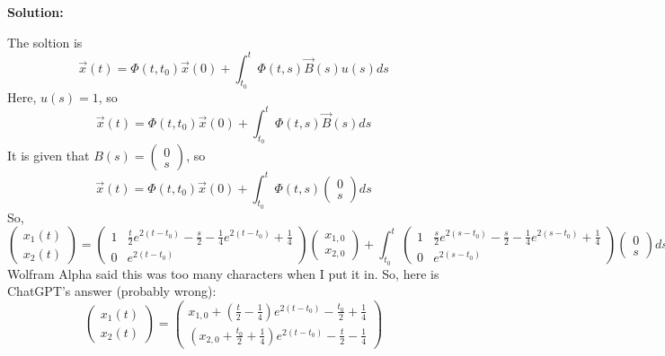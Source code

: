\documentclass[12pt]{article}
\newenvironment{solution}{
    \textbf{Solution:}
    
}{
    
    \vspace{2em}
}
\begin{document}
\begin{solution}
\begin{enumerate}[label=\alph*)]
        The soltion is
        \[
            \vec{x}(t) = \Phi(t,t_0)\vec{x}(0) + \int_{t_0}^t \Phi(t,s)\vec{B}(s)u(s)ds
        \]
        Here, \(u(s) = 1\), so
        \[
            \vec{x}(t) = \Phi(t,t_0)\vec{x}(0) + \int_{t_0}^t \Phi(t,s)\vec{B}(s)ds
        \]
        It is given that \(B(s) = \begin{pmatrix}
            0 \\
            s
        \end{pmatrix}\), so
        \[
            \vec{x}(t) = \Phi(t,t_0)\vec{x}(0) + \int_{t_0}^t \Phi(t,s)\begin{pmatrix}
            0 \\
            s
        \end{pmatrix}ds
        \]
        So,
        \[
            \begin{pmatrix}
                x_1(t) \\
                x_2(t)
            \end{pmatrix} = \begin{pmatrix}
                1 & \frac{t}{2}e^{2(t-t_0)} - \frac{s}{2} - \frac{1}{4}e^{2(t-t_0)} + \frac{1}{4} \\
                0 & e^{2(t-t_0)}
            \end{pmatrix} \begin{pmatrix}
                x_{1,0} \\
                x_{2,0}
            \end{pmatrix} + \int_{t_0}^t \begin{pmatrix}
                1 & \frac{s}{2}e^{2(s-t_0)} - \frac{s}{2} - \frac{1}{4}e^{2(s-t_0)} + \frac{1}{4} \\
                0 & e^{2(s-t_0)}
            \end{pmatrix} \begin{pmatrix}
                0 \\
                s
            \end{pmatrix}ds
            \]
            Wolfram Alpha said this was too many characters when I put it in. So, here is ChatGPT's answer (probably wrong):
            \[
                \begin{pmatrix}
                    x_1(t) \\
                    x_2(t)
                \end{pmatrix} = 
                \begin{pmatrix}
                    x_{1,0} + \left( \frac{t}{2} - \frac{1}{4} \right) e^{2(t-t_0)} - \frac{t_0}{2} + \frac{1}{4} \\
                    \left( x_{2,0} + \frac{t_0}{2} + \frac{1}{4} \right) e^{2(t-t_0)} - \frac{t}{2} - \frac{1}{4}
                \end{pmatrix}
            \]


    \end{enumerate}

\end{solution}
\end{document}
